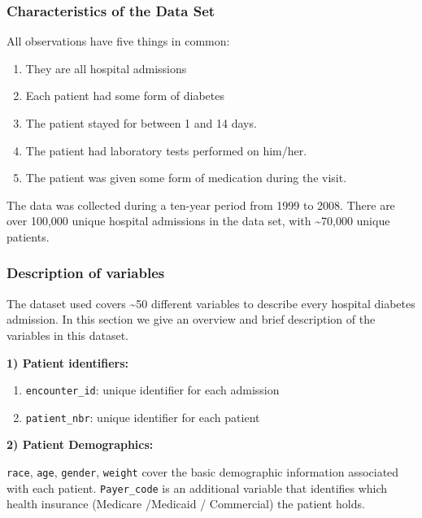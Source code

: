 \documentclass[
]{article}
\providecommand{\tightlist}{%
  \setlength{\itemsep}{0pt}\setlength{\parskip}{0pt}}
\begin{document}
\hypertarget{characteristics-of-the-data-set}{%
\subsubsection{Characteristics of the Data
Set}\label{characteristics-of-the-data-set}}

All observations have five things in common:

\begin{enumerate}
\def\labelenumi{\arabic{enumi}.}
\tightlist
\item
  They are all hospital admissions
\item
  Each patient had some form of diabetes
\item
  The patient stayed for between 1 and 14 days.
\item
  The patient had laboratory tests performed on him/her.
\item
  The patient was given some form of medication during the visit.
\end{enumerate}

The data was collected during a ten-year period from 1999 to 2008. There
are over 100,000 unique hospital admissions in the data set, with
\textasciitilde70,000 unique patients.

\hypertarget{description-of-variables}{%
\subsubsection{Description of
variables}\label{description-of-variables}}

The dataset used covers \textasciitilde50 different variables to
describe every hospital diabetes admission. In this section we give an
overview and brief description of the variables in this dataset.

\textbf{1) Patient identifiers:}

\begin{enumerate}
\def\labelenumi{\alph{enumi}.}
\tightlist
\item
  \texttt{encounter\_id}: unique identifier for each admission
\item
  \texttt{patient\_nbr}: unique identifier for each patient
\end{enumerate}

\textbf{2) Patient Demographics:}

\texttt{race}, \texttt{age}, \texttt{gender}, \texttt{weight} cover the
basic demographic information associated with each patient.
\texttt{Payer\_code} is an additional variable that identifies which
health insurance (Medicare /Medicaid / Commercial) the patient holds.
\end{document}
